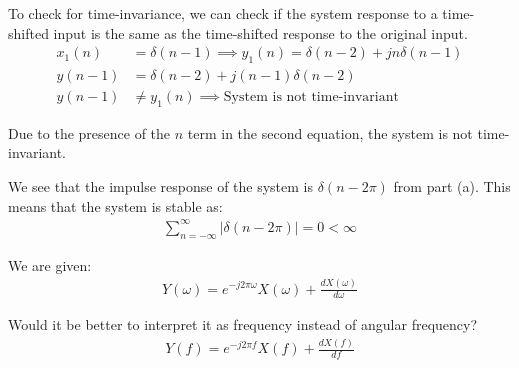 \documentclass{article}
\begin{document}
\begin{enumerate}[label=(\alph*)]
    To check for time-invariance, we can check if the system response to a time-shifted input is the same as the time-shifted response to the original input.
    \begin{align*}
        x_1(n) &= \delta(n-1) \implies y_1(n) = \delta(n-2) + jn\delta(n-1) \\
        y(n-1) &= \delta(n-2) + j(n-1)\delta(n-2) \\
        y(n-1) &\neq y_1(n) \implies \text{System is not time-invariant}
    \end{align*}

    Due to the presence of the $n$ term in the second equation, the system is not time-invariant.

    We see that the impulse response of the system is $\delta(n-2\pi)$ from part (a). This means that the system is stable as:
    \begin{align*}
        \sum_{n=-\infty}^{\infty} |\delta(n-2\pi)| = 0 < \infty
    \end{align*}
\end{enumerate}


We are given:
\begin{align*}
    Y(\omega) = e^{-j2\pi \omega}X(\omega) + \frac{dX(\omega)}{d\omega}
\end{align*}

Would it be better to interpret it as frequency instead of angular frequency?
\begin{align*}
    Y(f) = e^{-j2\pi f}X(f) + \frac{dX(f)}{df}
\end{align*}


\end{document}
